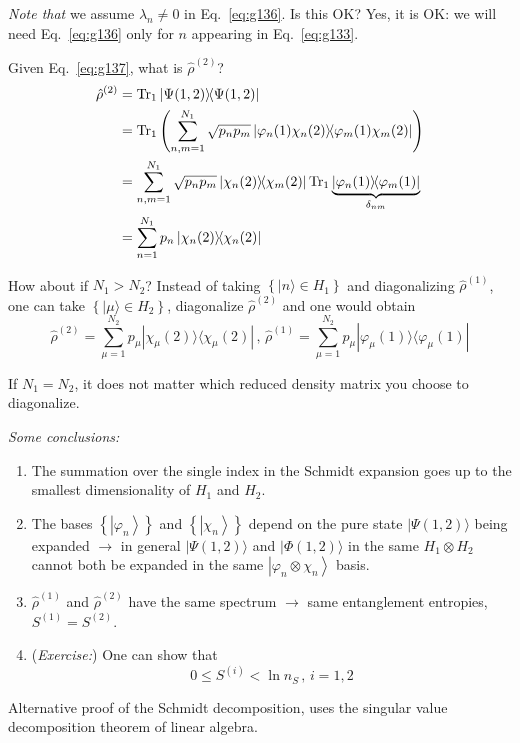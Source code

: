 \documentclass[12pt]{article}
\newcommand{\be}{\begin{equation}}
\newcommand{\ee}{\end{equation}}
\begin{document}

\emph{Note that} we assume $\lambda_n \neq 0$ in Eq.~\eqref{eq:g136}. Is this OK?
Yes, it is OK: we will need Eq.~\eqref{eq:g136} only for $n$
appearing in Eq.~\eqref{eq:g133}.

Given Eq.~\eqref{eq:g137}, what is $\hat{\rho}^{(2)}$?
\be
\begin{aligned}
\hat{\rho}^{(2)}
&=\Tr_1 \op{\Psi(1,2)}{\Psi(1,2)}\\
&=\Tr_1 \left(\sum_{n, m=1}^{N_{1}} \sqrt{p_{n} p_{m}} \op{\varphi_n(1)\chi_n(2)}{\varphi_m(1)\chi_m(2)}\right)\\
&=\sum_{n, m=1}^{N_{1}} \sqrt{p_{n} p_{m}} \op{\chi_n(2)}{\chi_m(2)}
\Tr_1 \underbrace{\op{\varphi_n(1)}{\varphi_m(1)}}_{\delta_{nm}}\\
&=\sum_{n=1}^{N_{1}} p_{n}\op{\chi_n(2)}{\chi_n(2)}
\end{aligned}
\ee

How about if \emph{$N_1 > N_2$}?
Instead of taking \(\left\{|n\rangle \in H_{1}\right\}\) and diagonalizing \(\hat{\rho}^{(1)}\),
one can take \(\left\{|\mu\rangle \in H_{2}\right\}\),  diagonalize \(\hat{\rho}^{(2)}\) and
one would obtain
\be
\hat{\rho}^{(2)}=\sum_{\mu=1}^{N_{2}} p_{\mu}|\chi_{\mu}(2)\rangle\langle \chi_{\mu}(2)|\,,\, 
\hat{\rho}^{(1)}=\sum_{\mu=1}^{N_{2}} p_{\mu}|\varphi_{\mu}(1)\rangle\langle\varphi_{\mu}(1)|
\ee


If \(N_{1}=N_{2}\), it does not matter which reduced density
matrix you choose to diagonalize.

\emph{Some conclusions:}
\begin{enumerate}
\item The summation over the single index in the
Schmidt expansion goes up to the smallest
dimensionality of \(H_{1}\) and \(H_{2}\).
\item The bases \(\left\{\left|\varphi_{n}\right\rangle\right\}\) and \(\left\{\left|\chi_{n}\right\rangle\right\}\) depend on the
pure state \(|\Psi(1,2)\rangle\) being expanded
$\rightarrow$
in general \(|\Psi(1,2)\rangle\) and \(|\Phi(1,2)\rangle\)
in the same \(H_1 \otimes H_2\) cannot both be
expanded in the same \(\left|\varphi_{n} \otimes \chi_{n}\right\rangle\) basis.
\item \(\hat{\rho}^{(1)}\) and \(\hat{\rho}^{(2)}\) have the same spectrum $\rightarrow$
same entanglement entropies, \(S^{(1)}=S^{(2)}\).
\item (\emph{Exercise:}) One can show that 
\be
0 \leqslant S^{(i)}<\ln n_{S}\,,\,i = 1,2 
\ee
\end{enumerate}
Alternative proof of the Schmidt decomposition,
uses the singular value decomposition theorem
of linear algebra.
\end{document}
